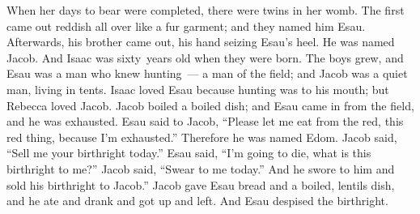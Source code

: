 \begin{inparaenum}
     When her days to bear were completed, there were twins in her womb.%
     The first came out reddish all over like a fur garment; and they named him Esau.%
     Afterwards, his brother came out, his hand seizing Esau's heel. He was named Jacob. And Isaac was sixty~years old when they were born.%
     The boys grew, and Esau was a man who knew hunting~--- a man of the field; and Jacob was a quiet man, living in tents.%
     Isaac loved Esau because hunting was to his mouth; but Rebecca loved Jacob.%
     Jacob boiled a boiled dish; and Esau came in from the field, and he was exhausted.%
     Esau said to Jacob, ``Please let me eat from the red, this red thing, because I'm exhausted.'' Therefore he was named Edom.%
     Jacob said, ``Sell me your birthright today.''%
     Esau said, ``I'm going to die, what is this birthright to me?''%
     Jacob said, ``Swear to me today.'' And he swore to him and sold his birthright to Jacob.''%
     Jacob gave Esau bread and a boiled, lentils dish, and he ate and drank and got up and left. And Esau despised the birthright.%
\end{inparaenum}
